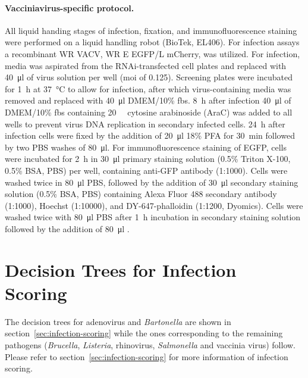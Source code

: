 \paragraph{Vacciniavirus-specific protocol.}
All liquid handing stages of infection, fixation, and immunofluorescence staining were performed on a liquid handling robot (BioTek, EL406). For infection assays a recombinant WR VACV, WR E EGFP\slash L mCherry, was utilized. For infection, media was aspirated from the RNAi-transfected cell plates and replaced with \SI{40}{\micro\litre} of virus solution per well (\gls{moi} of 0.125). Screening plates were incubated for \SI{1}{\hour} at \SI{37}{\celsius} to allow for infection, after which virus-containing media was removed and replaced with \SI{40}{\micro\litre} DMEM\slash 10\% \gls{fbs}. \SI{8}{\hour} after infection \SI{40}{\micro\litre} of DMEM\slash 10\% \gls{fbs} containing \SI{20}{\micro\Molar} cytosine arabinoside (AraC) was added to all wells to prevent virus DNA replication in secondary infected cells. \SI{24}{\hour} after infection cells were fixed by the addition of \SI{20}{\micro\litre} 18\% PFA for \SI{30}{\minute} followed by two PBS washes of \SI{80}{\micro\litre}. For immunofluorescence staining of EGFP, cells were incubated for \SI{2}{\hour} in \SI{30}{\micro\litre} primary staining solution (0.5\% Triton X-100, 0.5\% BSA, PBS) per well, containing anti-GFP antibody (1:1000). Cells were washed twice in \SI{80}{\micro\litre} PBS, followed by the addition of \SI{30}{\micro\litre} secondary staining solution (0.5\% BSA, PBS) containing Alexa Fluor 488 secondary antibody (1:1000), Hoechst (1:10000), and DY-647-phalloidin (1:1200, Dyomics). Cells were washed twice with \SI{80}{\micro\litre} PBS after \SI{1}{\hour} incubation in secondary staining solution followed by the addition of \SI{80}{\micro\litre} .

\section{Decision Trees for Infection Scoring}
\label{sec:app-dectree}
The decision trees for adenovirus and \textit{Bartonella} are shown in section~\ref{sec:infection-scoring} while the ones corresponding to the remaining pathogens (\textit{Brucella}, \textit{Listeria}, rhinovirus, \textit{Salmonella} and vaccinia virus) follow. Please refer to section~\ref{sec:infection-scoring} for more information of infection scoring.

